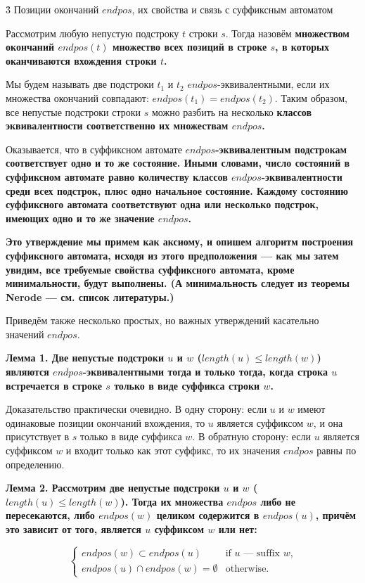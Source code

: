 \h3{ Позиции окончаний $endpos$, их свойства и связь с суффиксным автоматом }

Рассмотрим любую непустую подстроку $t$ строки $s$. Тогда назовём \bf{множеством окончаний} $endpos(t)$ множество всех позиций в строке $s$, в которых оканчиваются вхождения строки $t$.

Мы будем называть две подстроки $t_1$ и $t_2$ $endpos$-эквивалентными, если их множества окончаний совпадают: $endpos(t_1) = endpos(t_2)$. Таким образом, все непустые подстроки строки $s$ можно разбить на несколько \bf{классов эквивалентности} соответственно их множествам $endpos$.

Оказывается, что в суффиксном автомате \bf{$endpos$-эквивалентным подстрокам соответствует одно и то же состояние}. Иными словами, число состояний в суффиксном автомате равно количеству классов $endpos$-эквивалентности среди всех подстрок, плюс одно начальное состояние. Каждому состоянию суффиксного автомата соответствуют одна или несколько подстрок, имеющих одно и то же значение $endpos$.

\bf{Это утверждение мы примем как аксиому}, и опишем алгоритм построения суффиксного автомата, исходя из этого предположения --- как мы затем увидим, все требуемые свойства суффиксного автомата, кроме минимальности, будут выполнены. (А минимальность следует из теоремы Nerode --- см. список литературы.)

Приведём также несколько простых, но важных утверждений касательно значений $endpos$.

\bf{Лемма 1}. Две непустые подстроки $u$ и $w$ ($length(u) \le length(w)$) являются $endpos$-эквивалентными тогда и только тогда, когда строка $u$ встречается в строке $s$ только в виде суффикса строки $w$.

Доказательство практически очевидно. В одну сторону: если $u$ и $w$ имеют одинаковые позиции окончаний вхождения, то $u$ является суффиксом $w$, и она присутствует в $s$ только в виде суффикса $w$. В обратную сторону: если $u$ является суффиксом $w$ и входит только как этот суффикс, то их значения $endpos$ равны по определению.

\bf{Лемма 2}. Рассмотрим две непустые подстроки $u$ и $w$ ($length(u) \le length(w)$). Тогда их множества $endpos$ либо не пересекаются, либо $endpos(w)$ целиком содержится в $endpos(u)$, причём это зависит от того, является $u$ суффиксом $w$ или нет:

$$ \begin{cases}
endpos(w) \subset endpos(u) & \text{if $u$ --- suffix $w$,}
\\
endpos(u) \cap endpos(w) = \emptyset & \text{otherwise.}
\end{cases} $$

